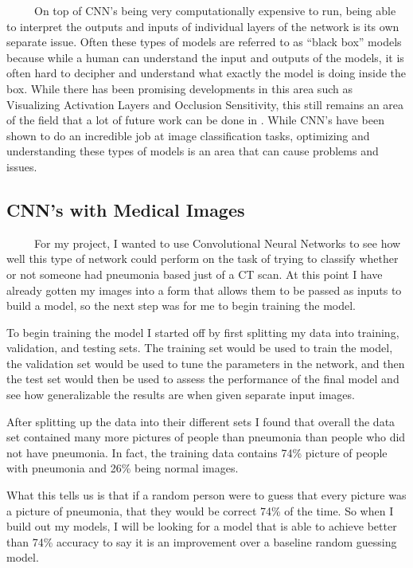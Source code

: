 \documentclass[12pt]{article}
\begin{document}
~~~~~On top of CNN's being very computationally expensive to run, being
able to interpret the outputs and inputs of individual layers of the
network is its own separate issue. Often these types of models are
referred to as ``black box'' models because while a human can understand
the input and outputs of the models, it is often hard to decipher and
understand what exactly the model is doing inside the box. While there
has been promising developments in this area such as Visualizing
Activation Layers and Occlusion Sensitivity, this still remains an area
of the field that a lot of future work can be done in \citet{Deep}.
While CNN's have been shown to do an incredible job at image
classification tasks, optimizing and understanding these types of models
is an area that can cause problems and issues.

\hypertarget{cnns-with-medical-images}{%
\subsection{CNN's with Medical Images}\label{cnns-with-medical-images}}

~~~~~For my project, I wanted to use Convolutional Neural Networks to
see how well this type of network could perform on the task of trying to
classify whether or not someone had pneumonia based just of a CT scan.
At this point I have already gotten my images into a form that allows
them to be passed as inputs to build a model, so the next step was for
me to begin training the model.

To begin training the model I started off by first splitting my data
into training, validation, and testing sets. The training set would be
used to train the model, the validation set would be used to tune the
parameters in the network, and then the test set would then be used to
assess the performance of the final model and see how generalizable the
results are when given separate input images.

After splitting up the data into their different sets I found that
overall the data set contained many more pictures of people than
pneumonia than people who did not have pneumonia. In fact, the training
data contains 74\% picture of people with pneumonia and 26\% being
normal images.

What this tells us is that if a random person were to guess that every
picture was a picture of pneumonia, that they would be correct 74\% of
the time. So when I build out my models, I will be looking for a model
that is able to achieve better than 74\% accuracy to say it is an
improvement over a baseline random guessing model.
\end{document}

